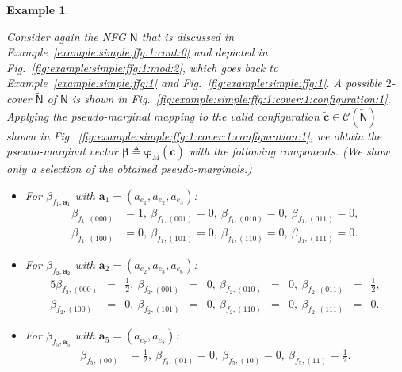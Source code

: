 \documentclass[journal, twocolumn]{IEEEtran}
\renewcommand{\mathbf}[1]{{\bm{#1}}}
\newcommand{\vect}[1]{\mathbf{#1}}
\newcommand{\code}[1]{\mathcal{#1}}
\newcommand{\graph}[1]{\mathsf{#1}}
\newcommand{\defeq}{\triangleq}
\newcommand{\codeC}{\code{C}}
\newcommand{\bel}{\beta}
\newcommand{\vbel}{\boldsymbol{\bel}}
\newcommand{\va}{\vect{a}}
\newcommand{\graphN}{\graph{N}}
\newcommand{\cover}[1]{\tilde{#1}}
\newcommand{\cgraph}[1]{\cover{\graph{#1}}}
\newcommand{\?}{\mathrm{?}}
\newcommand{\varphiM}{\boldsymbol{\varphi}_{M}}
\newcommand{\tvc}{\vect{\tilde{c}}}
\newtheorem{Example}[Lemma]{Example}
\begin{document}
\begin{Example}
  \label{example:simple:ffg:1:cont:3}

  Consider again the NFG $\graphN$ that is discussed in
  Example~\ref{example:simple:ffg:1:cont:0} and depicted in
  Fig.~\ref{fig:example:simple:ffg:1:mod:2}, which goes back to
  Example~\ref{example:simple:ffg:1} and
  Fig.~\ref{fig:example:simple:ffg:1}. A possible $2$-cover $\cgraph{N}$ of
  $\graphN$ is shown in
  Fig.~\ref{fig:example:simple:ffg:1:cover:1:configuration:1}. Applying the
  pseudo-marginal mapping to the valid configuration $\tvc \in
  \codeC(\cgraph{N})$ shown in
  Fig.~\ref{fig:example:simple:ffg:1:cover:1:configuration:1}, we obtain the
  pseudo-marginal vector $\vbel \defeq \varphiM(\tvc)$ with the following
  components. (We show only a selection of the obtained pseudo-marginals.)
  \begin{itemize}

  \item For $\beta_{f_1,\va_1}$ with $\va_1 = (a_{e_1}, a_{e_2}, a_{e_3})$:
    \begin{align*}
      \beta_{f_1,(000)}
        &\!=\! 1, \ 
      \beta_{f_1,(001)}
         \!=\! 0, \
      \beta_{f_1,(010)}
         \!=\! 0, \ 
      \beta_{f_1,(011)}
         \!=\! 0, \\
      \beta_{f_1,(100)}
        &\!=\! 0, \
      \beta_{f_1,(101)}
         \!=\! 0, \
      \beta_{f_1,(110)}
         \!=\! 0, \
      \beta_{f_1,(111)}
         \!=\! 0.
    \end{align*}

  \item For $\beta_{f_2,\va_2}$ with $\va_2 = (a_{e_2}, a_{e_3}, a_{e_6})$:
    \begin{alignat*}{5}
      \beta_{f_2,(000)}
        &{} \!= &{} \frac{1}{2}, \ 
      \beta_{f_2,(001)}
        &{} \!= &{} 0, \
      \beta_{f_2,(010)}
        &{} \!= &{} 0, \ 
      \beta_{f_2,(011)}
        &{} \!= &{} \frac{1}{2}, \\
      \beta_{f_2,(100)}
        &{} \!= &{} 0, \
      \beta_{f_2,(101)}
        &{} \!= &{} 0, \
      \beta_{f_2,(110)}
        &{} \!= &{} 0, \
      \beta_{f_2,(111)}
        &{} \!= &{} 0.
    \end{alignat*}

  \item For $\beta_{f_5,\va_5}$ with $\va_5 = (a_{e_7}, a_{e_8})$:
    \begin{align*}
      \beta_{f_5,(00)}
        &= \frac{1}{2}, \ 
      \beta_{f_5,(01)}
         = 0, \
      \beta_{f_5,(10)}
         = 0, \ 
      \beta_{f_5,(11)}
         = \frac{1}{2}.
    \end{align*}


\end{itemize}
\end{Example}
\end{document}
